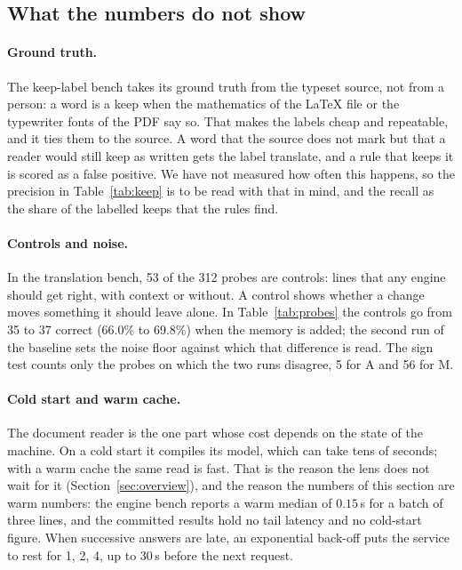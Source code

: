 \subsection{What the numbers do not show}\label{sec:threats}

\paragraph{Ground truth.} The keep-label bench takes its ground truth from the typeset source, not from a person: a word is a keep when the
mathematics of the \LaTeX{} file or the typewriter fonts of the PDF say so. That makes the labels cheap and repeatable, and it ties them to the
source. A word that the source does not mark but that a reader would still keep as written gets the label translate, and a rule that keeps it is
scored as a false positive. We have not measured how often this happens, so the precision in Table~\ref{tab:keep} is to be read with that in mind,
and the recall as the share of the labelled keeps that the rules find.

\paragraph{Controls and noise.} In the translation bench, 53 of the 312 probes are controls: lines that any engine should get right, with context or
without. A control shows whether a change moves something it should leave alone. In Table~\ref{tab:probes} the controls go from 35 to 37 correct
(66.0\% to 69.8\%) when the memory is added; the second run of the baseline sets the noise floor against which that difference is read. The sign test
counts only the probes on which the two runs disagree, 5 for A and 56 for M.

\paragraph{Cold start and warm cache.} The document reader is the one part whose cost depends on the state of the machine. On a cold start it compiles
its model, which can take tens of seconds; with a warm cache the same read is fast. That is the reason the lens does not wait for it
(Section~\ref{sec:overview}), and the reason the numbers of this section are warm numbers: the engine bench reports a warm median of
$0.15$\,s for a batch of three lines, and the committed results hold no tail latency and no cold-start figure. When successive answers are late, an
exponential back-off puts the service to rest for 1, 2, 4, up to 30\,s before the next request.

